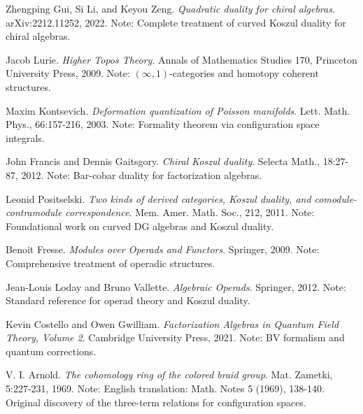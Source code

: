 \begin{thebibliography}{99}

Zhengping Gui, Si Li, and Keyou Zeng.
\textit{Quadratic duality for chiral algebras}.
arXiv:2212.11252, 2022.
Note: Complete treatment of curved Koszul duality for chiral algebras.

Jacob Lurie.
\textit{Higher Topos Theory}.
Annals of Mathematics Studies 170, Princeton University Press, 2009.
Note: $(\infty,1)$-categories and homotopy coherent structures.

Maxim Kontsevich.
\textit{Deformation quantization of Poisson manifolds}.
Lett. Math. Phys., 66:157-216, 2003.
Note: Formality theorem via configuration space integrals.

John Francis and Dennis Gaitsgory.
\textit{Chiral Koszul duality}.
Selecta Math., 18:27-87, 2012.
Note: Bar-cobar duality for factorization algebras.

Leonid Positselski.
\textit{Two kinds of derived categories, Koszul duality, and comodule-contramodule correspondence}.
Mem. Amer. Math. Soc., 212, 2011.
Note: Foundational work on curved DG algebras and Koszul duality.

Benoit Fresse.
\textit{Modules over Operads and Functors}.
Springer, 2009.
Note: Comprehensive treatment of operadic structures.

Jean-Louis Loday and Bruno Vallette.
\textit{Algebraic Operads}.
Springer, 2012.
Note: Standard reference for operad theory and Koszul duality.

Kevin Costello and Owen Gwilliam.
\textit{Factorization Algebras in Quantum Field Theory, Volume 2}.
Cambridge University Press, 2021.
Note: BV formalism and quantum corrections.


V. I. Arnold.
\textit{The cohomology ring of the colored braid group}.
Mat. Zametki, 5:227-231, 1969.
Note: English translation: Math. Notes 5 (1969), 138-140. 
Original discovery of the three-term relations for configuration spaces.


\end{thebibliography}
